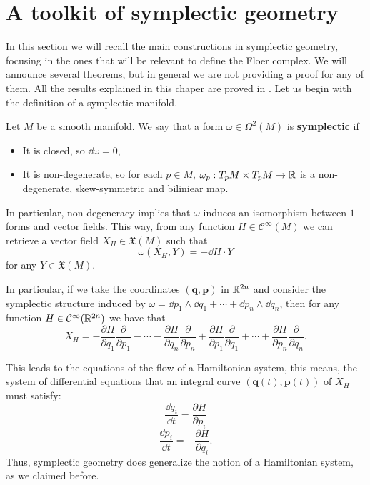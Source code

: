 \section{A toolkit of symplectic geometry}

In this section we will recall the main constructions in symplectic geometry, focusing in the ones that will be relevant to define the Floer complex. We will announce several theorems, but in general we are not providing a proof for any of them. All the results explained in this chaper are proved in \cite{da2001lectures}. Let us begin with the definition of a symplectic manifold.

\begin{deff}
Let $M$ be a smooth manifold. We say that a form $\omega \in \Omega^2(M)$ is {\bf symplectic} if

\begin{itemize}
	\item It is closed, so $\dd \omega = 0$,
	\item It is non-degenerate, so for each $p \in M$, $\omega_p : T_pM \times T_pM \rightarrow \mathbb{R}$ is a non-degenerate, skew-symmetric and biliniear map.
\end{itemize}
\end{deff}

In particular, non-degeneracy implies that $\omega$ induces an isomorphism between $1$-forms and vector fields. This way, from any function $H \in \mathcal{C}^{\infty}(M)$ we can retrieve a vector field $X_H \in \mathfrak{X}(M)$ such that
$$\omega(X_H,Y) = - \dd H \cdot Y$$
for any $Y \in \mathfrak{X}(M)$.

In particular, if we take the coordinates $(\mathbf{q},\mathbf{p})$ in $\mathbb{R}^{2n}$ and consider the symplectic structure induced by $\omega = \dd p_1 \wedge \dd q_1 + \cdots + \dd p_n \wedge \dd q_n$, then for any function $H \in \mathcal{C}^{\infty}(\mathbb{R}^{2n})$ we have that
$$X_H = - \frac{\partial H}{\partial q_1} \frac{\partial}{\partial p_1} - \cdots - \frac{\partial H}{\partial q_n} \frac{\partial}{\partial p_n} + \frac{\partial H}{\partial p_1} \frac{\partial}{\partial q_1} + \cdots + \frac{\partial H}{\partial p_n} \frac{\partial}{\partial q_n} .$$

This leads to the equations of the flow of a Hamiltonian system, this means, the system of differential equations that an integral curve $(\mathbf{q}(t),\mathbf{p}(t))$ of $X_H$ must satisfy:
$$\frac{\dd q_i}{\dd t} = \frac{\partial H}{\partial p_i}$$
$$\frac{\dd p_i}{\dd t} = - \frac{\partial H}{\partial q_i} .$$
Thus, symplectic geometry does generalize the notion of a Hamiltonian system, as we claimed before.

